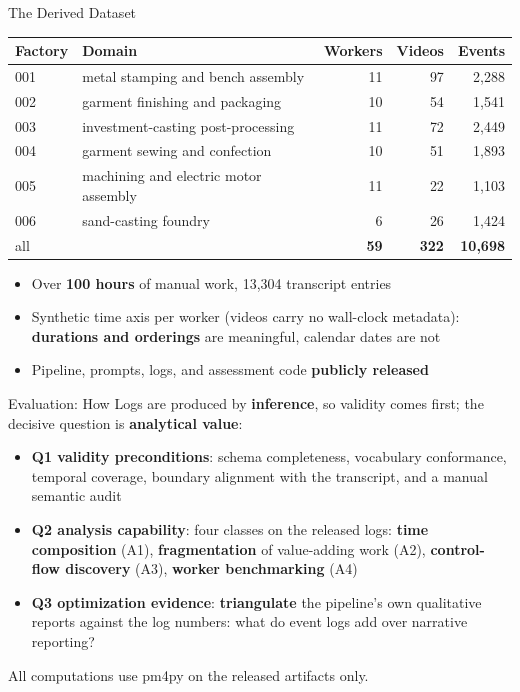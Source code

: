 \documentclass[aspectratio=169]{beamer}
\newcommand{\keyc}[1]{\textbf{\textcolor{egoblue}{#1}}}
\newcommand{\keyg}[1]{\textbf{\textcolor{egogreen!70!black}{#1}}}
\newcommand{\keya}[1]{\textbf{\textcolor{egoamber!85!black}{#1}}}
\begin{document}
\begin{frame}{The Derived Dataset}
  \begin{center}
  \small
  \begin{tabular}{llrrr}
    \toprule
    Factory & Domain & Workers & Videos & Events \\
    \midrule
    001 & metal stamping and bench assembly & 11 & 97 & 2{,}288 \\
    002 & garment finishing and packaging & 10 & 54 & 1{,}541 \\
    003 & investment-casting post-processing & 11 & 72 & 2{,}449 \\
    004 & garment sewing and confection & 10 & 51 & 1{,}893 \\
    005 & machining and electric motor assembly & 11 & 22 & 1{,}103 \\
    006 & sand-casting foundry & 6 & 26 & 1{,}424 \\
    \midrule
    all & & \keyc{59} & \keyc{322} & \keyc{10{,}698} \\
    \bottomrule
  \end{tabular}
  \end{center}
  \vspace{3mm}
  \begin{itemize}\setlength{\itemsep}{5pt}
    \item Over \keyc{100 hours} of manual work, 13{,}304 transcript entries
    \item Synthetic time axis per worker (videos carry no wall-clock metadata):
      \keyg{durations and orderings} are meaningful, calendar dates are not
    \item Pipeline, prompts, logs, and assessment code \keyg{publicly released}
  \end{itemize}
\end{frame}

\begin{frame}{Evaluation: How}
  Logs are produced by \keya{inference}, so validity comes first;
  the decisive question is \keyg{analytical value}:
  \vspace{2mm}
  \begin{itemize}\setlength{\itemsep}{8pt}
    \item \keyc{Q1 validity preconditions}: schema completeness, vocabulary
      conformance, temporal coverage, boundary alignment with the transcript,
      and a manual semantic audit
    \item \keyc{Q2 analysis capability}: four classes on the released logs:
      \keyg{time composition} (A1), \keyg{fragmentation} of value-adding work
      (A2), \keyg{control-flow discovery} (A3), \keyg{worker benchmarking} (A4)
    \item \keyc{Q3 optimization evidence}: \keyg{triangulate} the pipeline's
      own qualitative reports against the log numbers: what do event logs add
      over narrative reporting?
  \end{itemize}
  \vspace{2mm}
  \small All computations use pm4py on the released artifacts only.
\end{frame}
\end{document}
